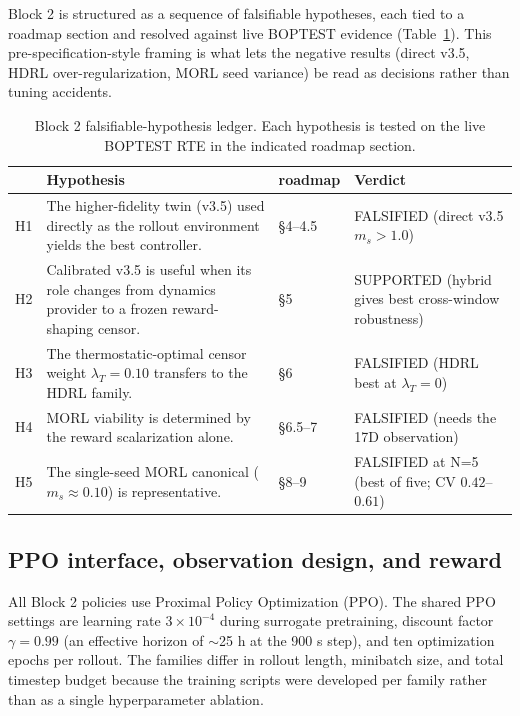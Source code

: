 \documentclass[11pt,a4paper]{article}
\begin{document}
Block 2 is structured as a sequence of falsifiable hypotheses, each tied to a roadmap section and resolved against live BOPTEST evidence (Table~\ref{tab:hypotheses}). This pre-specification-style framing is what lets the negative results (direct v3.5, HDRL over-regularization, MORL seed variance) be read as decisions rather than tuning accidents.

\begin{table}[H]
\centering
\caption{Block 2 falsifiable-hypothesis ledger. Each hypothesis is tested on the live BOPTEST RTE in the indicated roadmap section.}
\label{tab:hypotheses}
\small
\begin{tabular}{>{\raggedright\arraybackslash}p{5mm}>{\raggedright\arraybackslash}p{66mm}l>{\raggedright\arraybackslash}p{40mm}}
\toprule
 & Hypothesis & roadmap & Verdict \\
\midrule
H1 & The higher-fidelity twin (v3.5) used directly as the rollout environment yields the best controller. & \S4--4.5 & FALSIFIED (direct v3.5 $m_s>1.0$) \\
H2 & Calibrated v3.5 is useful when its role changes from dynamics provider to a frozen reward-shaping censor. & \S5 & SUPPORTED (hybrid gives best cross-window robustness) \\
H3 & The thermostatic-optimal censor weight $\lambda_T=0.10$ transfers to the HDRL family. & \S6 & FALSIFIED (HDRL best at $\lambda_T=0$) \\
H4 & MORL viability is determined by the reward scalarization alone. & \S6.5--7 & FALSIFIED (needs the 17D observation) \\
H5 & The single-seed MORL canonical ($m_s\approx0.10$) is representative. & \S8--9 & FALSIFIED at N=5 (best of five; CV $0.42$--$0.61$) \\
\bottomrule
\end{tabular}
\end{table}

\subsection{PPO interface, observation design, and reward}

All Block 2 policies use Proximal Policy Optimization (PPO). The shared PPO settings are learning rate $3\times 10^{-4}$ during surrogate pretraining, discount factor $\gamma=0.99$ (an effective horizon of $\sim$25 h at the 900 s step), and ten optimization epochs per rollout. The families differ in rollout length, minibatch size, and total timestep budget because the training scripts were developed per family rather than as a single hyperparameter ablation.
\end{document}

